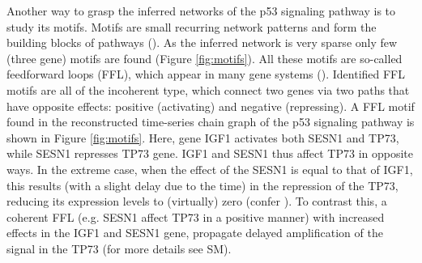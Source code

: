 \documentclass[a4paper]{article}
\begin{document}
Another way to grasp the inferred networks of the p53 signaling pathway is to study its motifs. Motifs are small recurring network patterns and form the building blocks of pathways (\cite{Alon2007}). As the inferred network is very sparse only few (three gene) motifs are found (Figure \ref{fig:motifs}). All these motifs are so-called feedforward loops (FFL), which appear in many gene systems (\cite{Alon2007}). Identified FFL motifs are all of the incoherent type, which connect two genes via two paths that have opposite effects:  positive (activating) and negative (repressing). A FFL motif found in the reconstructed time-series chain graph of the p53 signaling pathway is shown in Figure 
\ref{fig:motifs}. Here, gene IGF1 activates both SESN1 and TP73, while SESN1 represses TP73 gene. IGF1 and SESN1 thus affect TP73 in opposite ways. In the extreme case, when the effect of the SESN1 is equal to that of IGF1, this results (with a slight delay due to the time) in the repression of the TP73, reducing its expression levels to (virtually) zero (confer \cite{Alon2007}). To contrast this, a coherent FFL (e.g. SESN1 affect TP73 in a positive manner) with increased effects in the IGF1 and SESN1 gene, propagate delayed amplification of the signal in the TP73 (for more details see SM).


\end{document}
